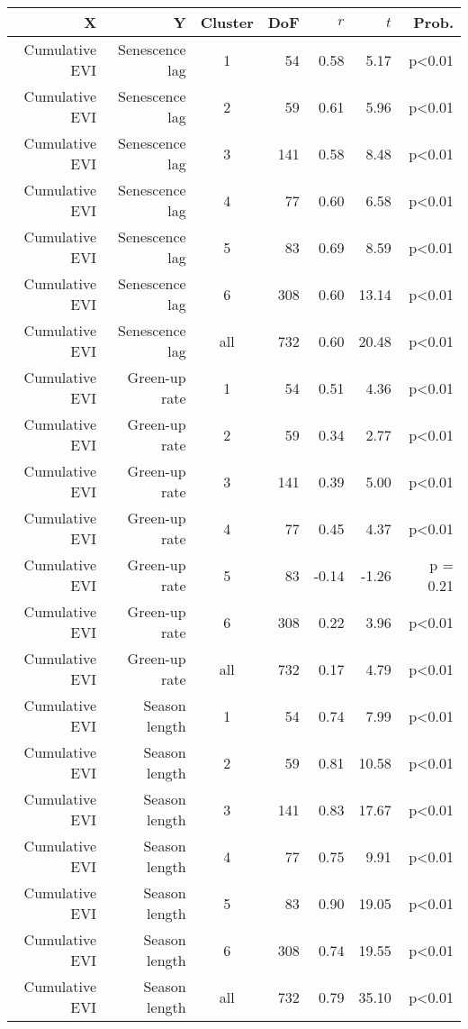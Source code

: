 \begin{table}[H]
\centering
\begin{tabular}{rrcrrrr}
  \hline
X & Y & Cluster & DoF & $r$ & $t$ & Prob. \\ 
  \hline
Cumulative EVI & Senescence lag & 1 &  54 & 0.58 & 5.17 & p<0.01 \\ 
  Cumulative EVI & Senescence lag & 2 &  59 & 0.61 & 5.96 & p<0.01 \\ 
  Cumulative EVI & Senescence lag & 3 & 141 & 0.58 & 8.48 & p<0.01 \\ 
  Cumulative EVI & Senescence lag & 4 &  77 & 0.60 & 6.58 & p<0.01 \\ 
  Cumulative EVI & Senescence lag & 5 &  83 & 0.69 & 8.59 & p<0.01 \\ 
  Cumulative EVI & Senescence lag & 6 & 308 & 0.60 & 13.14 & p<0.01 \\ 
  Cumulative EVI & Senescence lag & all & 732 & 0.60 & 20.48 & p<0.01 \\ 
   \hline
Cumulative EVI & Green-up rate & 1 &  54 & 0.51 & 4.36 & p<0.01 \\ 
  Cumulative EVI & Green-up rate & 2 &  59 & 0.34 & 2.77 & p<0.01 \\ 
  Cumulative EVI & Green-up rate & 3 & 141 & 0.39 & 5.00 & p<0.01 \\ 
  Cumulative EVI & Green-up rate & 4 &  77 & 0.45 & 4.37 & p<0.01 \\ 
  Cumulative EVI & Green-up rate & 5 &  83 & -0.14 & -1.26 & p = 0.21 \\ 
  Cumulative EVI & Green-up rate & 6 & 308 & 0.22 & 3.96 & p<0.01 \\ 
  Cumulative EVI & Green-up rate & all & 732 & 0.17 & 4.79 & p<0.01 \\ 
   \hline
Cumulative EVI & Season length & 1 &  54 & 0.74 & 7.99 & p<0.01 \\ 
  Cumulative EVI & Season length & 2 &  59 & 0.81 & 10.58 & p<0.01 \\ 
  Cumulative EVI & Season length & 3 & 141 & 0.83 & 17.67 & p<0.01 \\ 
  Cumulative EVI & Season length & 4 &  77 & 0.75 & 9.91 & p<0.01 \\ 
  Cumulative EVI & Season length & 5 &  83 & 0.90 & 19.05 & p<0.01 \\ 
  Cumulative EVI & Season length & 6 & 308 & 0.74 & 19.55 & p<0.01 \\ 
  Cumulative EVI & Season length & all & 732 & 0.79 & 35.10 & p<0.01 \\ 

\end{tabular}
\end{table}
